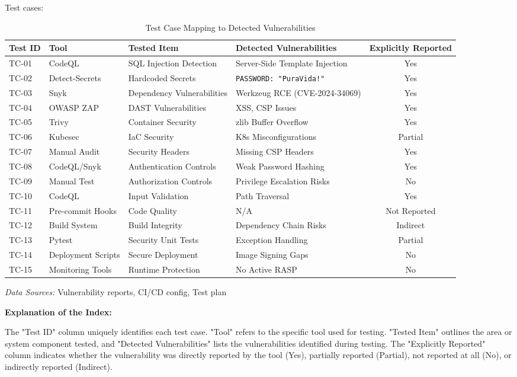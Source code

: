 \documentclass[conference]{IEEEtran}
\begin{document}
Test cases:

\begin{table*}[t]
    \caption{Test Case Mapping to Detected Vulnerabilities}
    \label{tab:tc-mapping}
    \centering
    \small
    \begin{tabular}{@{}llllc@{}}
        \toprule
        \textbf{Test ID} & \textbf{Tool} & \textbf{Tested Item} & \textbf{Detected Vulnerabilities} & \textbf{Explicitly Reported} \\
        \midrule
        TC-01 & CodeQL & SQL Injection Detection & Server-Side Template Injection  & Yes \\
        TC-02 & Detect-Secrets & Hardcoded Secrets & \texttt{PASSWORD: "PuraVida!"}  & Yes \\
        TC-03 & Snyk & Dependency Vulnerabilities & Werkzeug RCE (CVE-2024-34069)  & Yes \\
        TC-04 & OWASP ZAP & DAST Vulnerabilities & XSS, CSP Issues  & Yes \\
        TC-05 & Trivy & Container Security & zlib Buffer Overflow  & Yes \\
        TC-06 & Kubesec & IaC Security & K8s Misconfigurations  & Partial \\
        TC-07 & Manual Audit & Security Headers & Missing CSP Headers  & Yes \\
        TC-08 & CodeQL/Snyk & Authentication Controls & Weak Password Hashing  & Yes \\
        TC-09 & Manual Test & Authorization Controls & Privilege Escalation Risks & No \\
        TC-10 & CodeQL & Input Validation & Path Traversal  & Yes \\
        TC-11 & Pre-commit Hooks & Code Quality & N/A & Not Reported \\
        TC-12 & Build System & Build Integrity & Dependency Chain Risks & Indirect \\
        TC-13 & Pytest & Security Unit Tests & Exception Handling  & Partial \\
        TC-14 & Deployment Scripts & Secure Deployment & Image Signing Gaps & No \\
        TC-15 & Monitoring Tools & Runtime Protection & No Active RASP & No \\
        \bottomrule
    \end{tabular}
    \parbox{\columnwidth}{\footnotesize \textit{Data Sources:} Vulnerability reports, CI/CD config, Test plan}
\end{table*}

\vspace{1em} %

\textbf{Explanation of the Index:} 

The "Test ID" column uniquely identifies each test case. "Tool" refers to the specific tool used for testing. "Tested Item" outlines the area or system component tested, and "Detected Vulnerabilities" lists the vulnerabilities identified during testing. The "Explicitly Reported" column indicates whether the vulnerability was directly reported by the tool (Yes), partially reported (Partial), not reported at all (No), or indirectly reported (Indirect).
\end{document}
